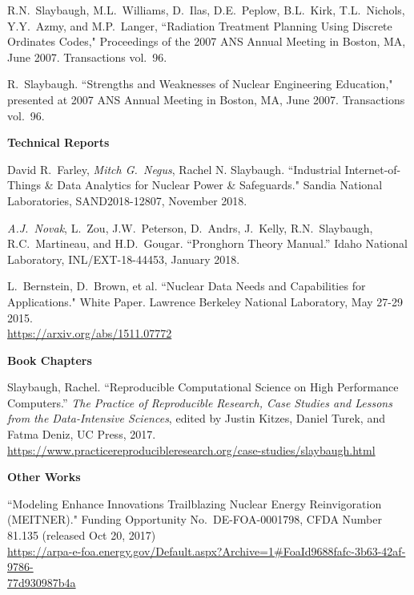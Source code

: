 \begin{bibsection}
\item R.N.\ Slaybaugh, M.L.\ Williams, D.\ Ilas, D.E.\ Peplow, B.L.\ Kirk, T.L.\ Nichols, Y.Y.\ Azmy, and M.P.\ Langer, ``Radiation Treatment Planning Using Discrete Ordinates Codes," Proceedings of the 2007 ANS Annual Meeting in Boston, MA, June 2007. Transactions vol.\ 96.

\item R.\ Slaybaugh. ``Strengths and Weaknesses of Nuclear Engineering Education," presented at 2007 ANS Annual Meeting in Boston, MA, June 2007. Transactions vol.\ 96.

\item \textbf{Technical Reports}
\item David R.\ Farley, \textit{Mitch G.\ Negus}, Rachel N.
 Slaybaugh. ``Industrial Internet-of-Things \& Data Analytics for Nuclear Power \& Safeguards." Sandia National Laboratories, SAND2018-12807, November 2018.

\item	\textit{A.J.\ Novak}, L.\ Zou, J.W.\ Peterson, D.\ Andrs, J.\ Kelly, R.N.\ Slaybaugh, R.C.\ Martineau, and H.D.\ Gougar. “Pronghorn Theory Manual.” Idaho National Laboratory, INL/EXT-18-44453, January 2018.

\item L.\ Bernstein, D.\ Brown, et al. ``Nuclear Data Needs and Capabilities for Applications." White Paper. Lawrence Berkeley National Laboratory, May 27-29 2015. \\
\url{https://arxiv.org/abs/1511.07772}


\item \textbf{Book Chapters}
\item Slaybaugh, Rachel. ``Reproducible Computational Science on High Performance Computers.'' \textit{The Practice of Reproducible Research, Case Studies and Lessons from the Data-Intensive Sciences}, edited by Justin Kitzes, Daniel Turek, and Fatma Deniz, UC Press, 2017. \\ \url{https://www.practicereproducibleresearch.org/case-studies/slaybaugh.html}


\item \textbf{Other Works}
\item ``Modeling Enhance Innovations Trailblazing Nuclear Energy Reinvigoration (MEITNER)." Funding Opportunity No.\ DE-FOA-0001798, CFDA Number 81.135 (released Oct 20, 2017)\\
\url{https://arpa-e-foa.energy.gov/Default.aspx?Archive=1#FoaId9688fafc-3b63-42af-9786-}\\ \url{77d930987b4a}


\end{bibsection}
